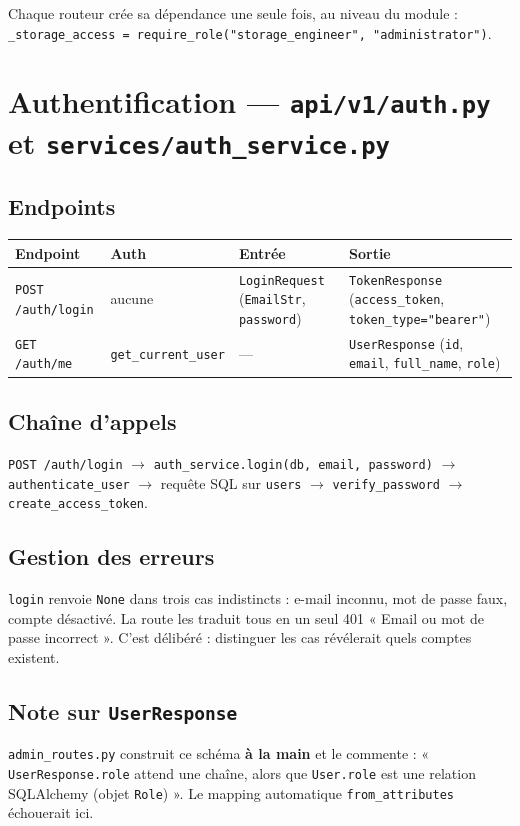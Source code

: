 \documentclass[11pt,a4paper]{report}
\newcommand{\file}[1]{\texttt{\small #1}}
\newcommand{\fn}[1]{\texttt{\small\textcolor{oasisviolet}{#1}}}
\newcommand{\cls}[1]{\texttt{\small\textcolor{oasisblue}{#1}}}
\newcommand{\tbl}[1]{\texttt{\small\textcolor{oasisamber}{#1}}}
\newcommand{\route}[1]{\texttt{\small\textcolor{oasisgreen}{#1}}}
\newcommand{\arrowto}{\ensuremath{\rightarrow}}
\begin{document}
\noindent
Chaque routeur crée sa dépendance une seule fois, au niveau du module :
\texttt{\_storage\_access = require\_role("storage\_engineer", "administrator")}.

\section{Authentification --- \file{api/v1/auth.py} et \file{services/auth\_service.py}}

\subsection*{Endpoints}

\begin{longtable}{@{}p{3.4cm}p{2.4cm}p{4.2cm}p{4.5cm}@{}}
\toprule
\textbf{Endpoint} & \textbf{Auth} & \textbf{Entrée} & \textbf{Sortie}\\
\midrule
\endhead
\route{POST /auth/login} & aucune & \cls{LoginRequest} (\texttt{EmailStr}, \texttt{password}) & \cls{TokenResponse} (\texttt{access\_token}, \texttt{token\_type="bearer"})\\
\route{GET /auth/me} & \fn{get\_current\_user} & --- & \cls{UserResponse} (\texttt{id}, \texttt{email}, \texttt{full\_name}, \texttt{role})\\
\bottomrule
\end{longtable}

\subsection*{Chaîne d'appels}
\route{POST /auth/login} \arrowto{} \fn{auth\_service.login(db, email, password)}
\arrowto{} \fn{authenticate\_user} \arrowto{} requête SQL sur \tbl{users}
\arrowto{} \fn{verify\_password} \arrowto{} \fn{create\_access\_token}.

\subsection*{Gestion des erreurs}
\fn{login} renvoie \texttt{None} dans trois cas indistincts : e-mail inconnu,
mot de passe faux, compte désactivé. La route les traduit tous en un seul 401
« Email ou mot de passe incorrect ». C'est délibéré : distinguer les cas
révélerait quels comptes existent.

\subsection*{Note sur \cls{UserResponse}}
\file{admin\_routes.py} construit ce schéma \textbf{à la main} et le commente :
« \texttt{UserResponse.role} attend une chaîne, alors que \texttt{User.role} est
une relation SQLAlchemy (objet \cls{Role}) ». Le mapping automatique
\texttt{from\_attributes} échouerait ici.
\end{document}

